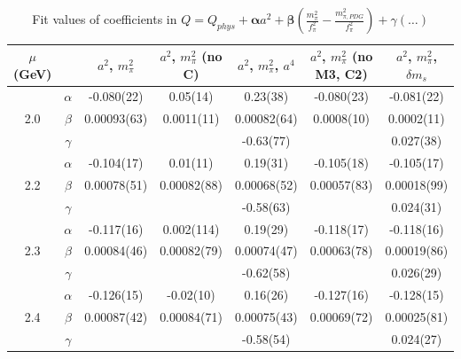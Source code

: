 \documentclass[12pt]{extarticle}
\begin{document}
\begin{table}[h!]
\begin{center}
\begin{tabular}{|c c|c|c|c|c|c|}
\hline
$\mu$ (GeV) &  & $a^2$, $m_\pi^2$& $a^2$, $m_\pi^2$ (no C)& $a^2$, $m_\pi^2$, $a^4$& $a^2$, $m_\pi^2$ (no M3, C2)& $a^2$, $m_\pi^2$, $\delta m_s$\\
\hline
\multirow{3}{0.5in}{2.0} & $\alpha$ & -0.080(22)& 0.05(14)& 0.23(38)& -0.080(23)& -0.081(22)\\
 & $\beta$ & 0.00093(63)& 0.0011(11)& 0.00082(64)& 0.0008(10)& 0.0002(11)\\
 & $\gamma$ &  &  & -0.63(77)&  & 0.027(38)\\
\hline
\multirow{3}{0.5in}{2.2} & $\alpha$ & -0.104(17)& 0.01(11)& 0.19(31)& -0.105(18)& -0.105(17)\\
 & $\beta$ & 0.00078(51)& 0.00082(88)& 0.00068(52)& 0.00057(83)& 0.00018(99)\\
 & $\gamma$ &  &  & -0.58(63)&  & 0.024(31)\\
\hline
\multirow{3}{0.5in}{2.3} & $\alpha$ & -0.117(16)& 0.002(114)& 0.19(29)& -0.118(17)& -0.118(16)\\
 & $\beta$ & 0.00084(46)& 0.00082(79)& 0.00074(47)& 0.00063(78)& 0.00019(86)\\
 & $\gamma$ &  &  & -0.62(58)&  & 0.026(29)\\
\hline
\multirow{3}{0.5in}{2.4} & $\alpha$ & -0.126(15)& -0.02(10)& 0.16(26)& -0.127(16)& -0.128(15)\\
 & $\beta$ & 0.00087(42)& 0.00084(71)& 0.00075(43)& 0.00069(72)& 0.00025(81)\\
 & $\gamma$ &  &  & -0.58(54)&  & 0.024(27)\\
\hline
\end{tabular}
\caption{Fit values of coefficients in $Q = Q_{phys} + \mathbf{\alpha} a^2 + \mathbf{\beta}\left(\frac{m_\pi^2}{f_\pi^2}-\frac{m_{\pi,PDG}^2}{f_\pi^2}\right) + \gamma(\ldots)$}
\end{center}
\end{table}




















\clearpage
\end{document}
